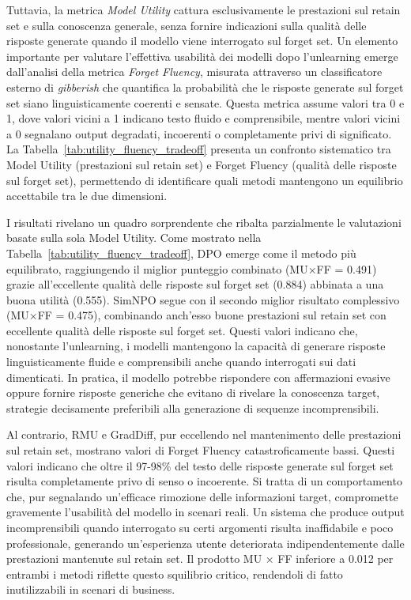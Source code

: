 Tuttavia, la metrica \emph{Model Utility} cattura esclusivamente le prestazioni sul retain set e sulla conoscenza generale, senza fornire indicazioni sulla qualità delle risposte generate quando il modello viene interrogato sul forget set. Un elemento importante per valutare l'effettiva usabilità dei modelli dopo l'unlearning emerge dall'analisi della metrica \emph{Forget Fluency}, misurata attraverso un classificatore esterno di \emph{gibberish} che quantifica la probabilità che le risposte generate sul forget set siano linguisticamente coerenti e sensate. Questa metrica assume valori tra 0 e 1, dove valori vicini a 1 indicano testo fluido e comprensibile, mentre valori vicini a 0 segnalano output degradati, incoerenti o completamente privi di significato. La Tabella~\ref{tab:utility_fluency_tradeoff} presenta un confronto sistematico tra Model Utility (prestazioni sul retain set) e Forget Fluency (qualità delle risposte sul forget set), permettendo di identificare quali metodi mantengono un equilibrio accettabile tra le due dimensioni.

I risultati rivelano un quadro sorprendente che ribalta parzialmente le valutazioni basate sulla sola Model Utility. Come mostrato nella Tabella~\ref{tab:utility_fluency_tradeoff}, DPO emerge come il metodo più equilibrato, raggiungendo il miglior punteggio combinato (MU×FF = 0.491) grazie all'eccellente qualità delle risposte sul forget set (0.884) abbinata a una buona utilità (0.555). SimNPO segue con il secondo miglior risultato complessivo (MU×FF = 0.475), combinando anch'esso buone prestazioni sul retain set con eccellente qualità delle risposte sul forget set. Questi valori indicano che, nonostante l'unlearning, i modelli mantengono la capacità di generare risposte linguisticamente fluide e comprensibili anche quando interrogati sui dati dimenticati. In pratica, il modello potrebbe rispondere con affermazioni evasive oppure fornire risposte generiche che evitano di rivelare la conoscenza target, strategie decisamente preferibili alla generazione di sequenze incomprensibili.

Al contrario, RMU e GradDiff, pur eccellendo nel mantenimento delle prestazioni sul retain set, mostrano valori di Forget Fluency catastroficamente bassi. Questi valori indicano che oltre il 97-98\% del testo delle risposte generate sul forget set risulta completamente privo di senso o incoerente. Si tratta di un comportamento che, pur segnalando un'efficace rimozione delle informazioni target, compromette gravemente l'usabilità del modello in scenari reali. Un sistema che produce output incomprensibili quando interrogato su certi argomenti risulta inaffidabile e poco professionale, generando un'esperienza utente deteriorata indipendentemente dalle prestazioni mantenute sul retain set. Il prodotto MU × FF inferiore a 0.012 per entrambi i metodi riflette questo squilibrio critico, rendendoli di fatto inutilizzabili in scenari di business.

